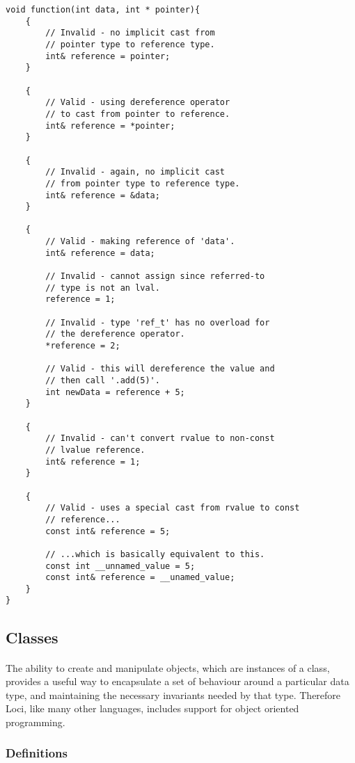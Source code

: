 \documentclass[12pt,twoside,notitlepage]{report}
\begin{document}
\begin{lstlisting}
void function(int data, int * pointer){
	{
		// Invalid - no implicit cast from
		// pointer type to reference type.
		int& reference = pointer;
	}
	
	{
		// Valid - using dereference operator
		// to cast from pointer to reference.
		int& reference = *pointer;
	}
	
	{
		// Invalid - again, no implicit cast
		// from pointer type to reference type.
		int& reference = &data;
	}
	
	{
		// Valid - making reference of 'data'.
		int& reference = data;
	
		// Invalid - cannot assign since referred-to
		// type is not an lval.
		reference = 1;
		
		// Invalid - type 'ref_t' has no overload for
		// the dereference operator.
		*reference = 2;
		
		// Valid - this will dereference the value and
		// then call '.add(5)'.
		int newData = reference + 5;
	}
	
	{
		// Invalid - can't convert rvalue to non-const
		// lvalue reference.
		int& reference = 1;
	}
	
	{	
		// Valid - uses a special cast from rvalue to const
		// reference...
		const int& reference = 5;
		
		// ...which is basically equivalent to this.
		const int __unnamed_value = 5;
		const int& reference = __unamed_value;
	}
}
\end{lstlisting}

\clearpage

\subsection{Classes}

\paragraph{}
The ability to create and manipulate objects, which are instances of a class, provides a useful way to encapsulate a set of behaviour around a particular data type, and maintaining the necessary invariants needed by that type. Therefore Loci, like many other languages, includes support for object oriented programming.

\subsubsection{Definitions}
\end{document}
